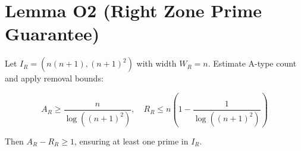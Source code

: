 
\section*{Lemma O2 (Right Zone Prime Guarantee)}

Let \( I_R = (n(n+1), (n+1)^2) \) with width \( W_R = n \).  
Estimate A-type count and apply removal bounds:

\[
A_R \geq \frac{n}{\log((n+1)^2)}, \quad R_R \leq n \left(1 - \frac{1}{\log((n+1)^2)}\right)
\]

Then \( A_R - R_R \geq 1 \), ensuring at least one prime in \( I_R \).
